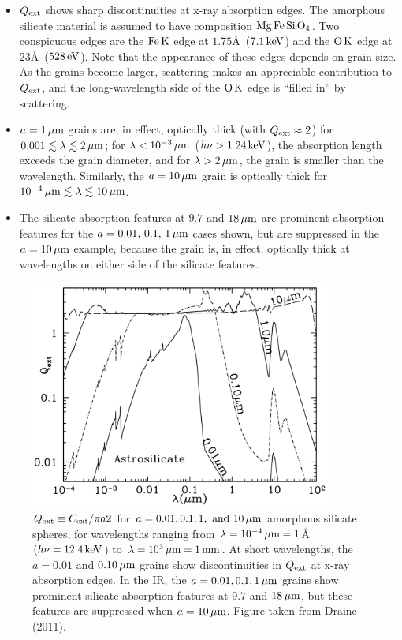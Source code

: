 \documentclass[a4paper,10pt]{article}
\begin{document}
\begin{itemize}
    \item $Q_{\rm ext}$ shows sharp discontinuities at x-ray absorption edges. The amorphous silicate material is assumed to have composition ${\rm Mg\,Fe\,Si\,O_4}$. Two conspicuous edges are the ${\rm Fe\,K}$ edge at $1.75$\AA~($7.1\,{\rm keV}$) and the ${\rm O\,K}$ edge at $23$\AA~($528\,{\rm eV}$). Note that the appearance of these edges depends on grain size. As the grains become larger, scattering makes an appreciable contribution to $Q_{\rm ext}$, and the long-wavelength side of the ${\rm O\,K}$ edge is ``filled in'' by scattering.
    \item $a=1\,\mu{\rm m}$ grains are, in effect, optically thick (with $Q_{\rm ext}\approx2$) for $0.001\lesssim\lambda\lesssim 2\,\mu{\rm m}$; for $\lambda < 10^{-3}\,\mu{\rm m}$ ($h\nu>1.24\,{\rm keV}$), the absorption length exceeds the grain diameter, and for $\lambda>2\,\mu{\rm m}$, the grain is smaller than the wavelength. Similarly, the $a=10\,\mu{\rm m}$ grain is optically thick for $10^{-4}\,\mu{\rm m} \lesssim\lambda\lesssim 10\,\mu{\rm m}$.
    \item The silicate absorption features at $9.7$ and $18\,\mu{\rm m}$ are prominent absorption features for the $a=0.01,\,0.1,\,1\,\mu{\rm m}$ cases shown, but are suppressed in the $a=10\,\mu{\rm m}$ example, because the grain is, in effect, optically thick at wavelengths on either side of the silicate features.
\end{itemize}

\begin{figure}[t]
    \centering
    \includegraphics[width=10cm]{figures/Qext_grainsizes.png}
    \caption{\footnotesize{$Q_{\rm ext}\equiv C_{\rm ext}/\pi a2$ for $a=0.01,0.1,1,~{\rm and}~10\,\mu{\rm m}$ amorphous silicate spheres, for wavelengths ranging from $\lambda=10^{-4}\,\mu{\rm m}=1$\AA\, $(h\nu=12.4\,{\rm keV}$) to $\lambda=10^3\,\mu{\rm m}=1\,{\rm mm}$. At short wavelengths, the $a=0.01$ and $0.10\,\mu{\rm m}$ grains show discontinuities in $Q_{\rm ext}$ at x-ray absorption edges. In the IR, the $a=0.01,0.1,1\,\mu{\rm m}$ grains show prominent silicate absorption features at $9.7$ and $18\,\mu{\rm m}$, but these features are suppressed when $a=10\,\mu{\rm m}$. Figure taken from Draine (2011).}}
    \label{fig:Qextgrainsizes}
\end{figure}
\end{document}
